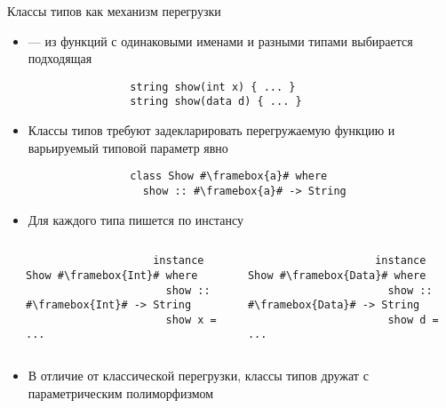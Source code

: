     \begin{frame}[fragile]{Классы типов как механизм перегрузки}
        \begin{itemize}
            \item {} --- из функций с одинаковыми именами и разными типами выбирается подходящая
            \begin{verbatim}
                string show(int x) { ... }
                string show(data d) { ... }
            \end{verbatim}
            \item Классы типов требуют задекларировать перегружаемую функцию и варьируемый типовой параметр явно
            \begin{verbatim}
                class Show #\framebox{a}# where
                  show :: #\framebox{a}# -> String
            \end{verbatim}
            \item Для каждого типа пишется по инстансу
        \end{itemize}
        \vspace{-1em}
        \begin{columns}[onlytextwidth]
            \begin{column}[t]{0.05\textwidth}
            \end{column}\hfill%
            \begin{column}[t]{0.485\textwidth}
                \begin{verbatim}
                    instance Show #\framebox{Int}# where
                      show :: #\framebox{Int}# -> String
                      show x = ...
                \end{verbatim}
            \end{column}\hfill%
            \begin{column}[t]{0.485\textwidth}
                \begin{verbatim}
                    instance Show #\framebox{Data}# where
                      show :: #\framebox{Data}# -> String
                      show d = ...
                \end{verbatim}
            \end{column}
        \end{columns}
        \vspace{0.5em}
        \begin{itemize}
            \item В отличие от классической перегрузки, классы типов дружат с параметрическим полиморфизмом
        \end{itemize}
    \end{frame}

